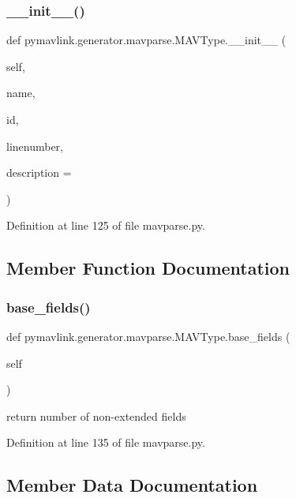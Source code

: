 \subsubsection{\texorpdfstring{\_\_init\_\_()}{\_\_init\_\_()}}
{\footnotesize\ttfamily def pymavlink.\+generator.\+mavparse.\+M\+A\+V\+Type.\+\_\+\+\_\+init\+\_\+\+\_\+ (\begin{DoxyParamCaption}\item[{}]{self,  }\item[{}]{name,  }\item[{}]{id,  }\item[{}]{linenumber,  }\item[{}]{description = {\ttfamily \textquotesingle{}\textquotesingle{}} }\end{DoxyParamCaption})}



Definition at line 125 of file mavparse.\+py.



\subsection{Member Function Documentation}
\mbox{\label{classpymavlink_1_1generator_1_1mavparse_1_1MAVType_ac07035e475c25d71205939bc52bafcdc}} 
\subsubsection{\texorpdfstring{base\_fields()}{base\_fields()}}
{\footnotesize\ttfamily def pymavlink.\+generator.\+mavparse.\+M\+A\+V\+Type.\+base\+\_\+fields (\begin{DoxyParamCaption}\item[{}]{self }\end{DoxyParamCaption})}

\begin{DoxyVerb}return number of non-extended fields\end{DoxyVerb}
 

Definition at line 135 of file mavparse.\+py.



\subsection{Member Data Documentation}
\mbox{\label{classpymavlink_1_1generator_1_1mavparse_1_1MAVType_a17b35e45a6c81c122cd9b2bad5d9d915}} 
